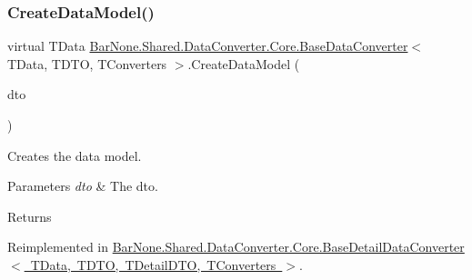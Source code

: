 \subsubsection{\texorpdfstring{Create\+Data\+Model()}{CreateDataModel()}\hspace{0.1cm}{\footnotesize\ttfamily [1/2]}}
{\footnotesize\ttfamily virtual T\+Data \mbox{\hyperlink{class_bar_none_1_1_shared_1_1_data_converter_1_1_core_1_1_base_data_converter}{Bar\+None.\+Shared.\+Data\+Converter.\+Core.\+Base\+Data\+Converter}}$<$ T\+Data, T\+D\+TO, T\+Converters $>$.Create\+Data\+Model (\begin{DoxyParamCaption}\item[{T\+D\+TO}]{dto }\end{DoxyParamCaption})\hspace{0.3cm}{\ttfamily [virtual]}}



Creates the data model. 


\begin{DoxyParams}{Parameters}
{\em dto} & The dto.\\
\hline
\end{DoxyParams}
\begin{DoxyReturn}{Returns}

\end{DoxyReturn}


Reimplemented in \mbox{\hyperlink{class_bar_none_1_1_shared_1_1_data_converter_1_1_core_1_1_base_detail_data_converter_ad6225cb3dbfdf5c776a24ca4a3339c5f}{Bar\+None.\+Shared.\+Data\+Converter.\+Core.\+Base\+Detail\+Data\+Converter$<$ T\+Data, T\+D\+T\+O, T\+Detail\+D\+T\+O, T\+Converters $>$}}.

\mbox{\label{class_bar_none_1_1_shared_1_1_data_converter_1_1_core_1_1_base_data_converter_a804f60b7e9daa91b624ee16f8556b405}} 
